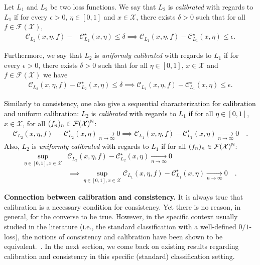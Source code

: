 \begin{definition}[Calibration]
Let $L_1$ and $L_2$ be two loss functions. We say that $L_2$ is \emph{calibrated} with regards to $L_1$ if for every $\epsilon>0$, $\eta\in[0,1]$ and $x\in\mathcal{X}$, there exists $ \delta>0$ such that for all $f\in\mathcal{F}(\mathcal{X})$,
\begin{align*}
    \mathcal{C}_{L_2}(x,\eta,f)- &\mathcal{C}^\star_{L_2}(x,\eta)\leq\delta\implies\mathcal{C}_{L_1}(x,\eta,f)- \mathcal{C}^\star_{L_1}(x,\eta)\leq \epsilon.
\end{align*}

Furthermore, we say that $L_2$ is \emph{uniformly calibrated} with regards to $L_1$ if for every $\epsilon>0$, there exists $ \delta>0$ such that for all $\eta\in[0,1]$, $x\in\mathcal{X}$ and $f\in\mathcal{F}(\mathcal{X})$ we have
\begin{align*}
    \mathcal{C}_{L_2}(x,\eta,f)- \mathcal{C}^\star_{L_2}(x,\eta)\leq\delta\implies\mathcal{C}_{L_1}(x,\eta,f)- \mathcal{C}^\star_{L_1}(x,\eta)\leq \epsilon.
\end{align*}
\end{definition}

\textcolor{black}{
Similarly to consistency, one also give a sequential characterization for calibration and uniform calibration: $L_2$ is \emph{calibrated} with regards to $L_1$ if for all $\eta\in[0,1]$, $x\in\mathcal{X}$, for all $(f_n)_n\in\mathcal{F}(\mathcal{X})^\mathbb{N}$:
\begin{align*}
   \mathcal{C}_{L_2}(x,\eta,f)&- \mathcal{C}^\star_{L_2}(x,\eta)\xrightarrow[n\to\infty]{} 0
   \implies \mathcal{C}_{L_1}(x,\eta,f)- \mathcal{C}^\star_{L_1}(x,\eta)\xrightarrow[n\to\infty]{} 0\quad.
\end{align*}
} 
\textcolor{black}{
Also, $L_2$ is \emph{uniformly calibrated} with regards to $L_1$ if for all $(f_n)_n\in\mathcal{F}(\mathcal{X})^\mathbb{N}$:
\begin{align*}
    \sup_{\eta\in[0,1],x\in\mathcal{X}} &\mathcal{C}_{L_2}(x,\eta,f)- \mathcal{C}^\star_{L_2}(x,\eta)\xrightarrow[n\to\infty]{} 0\\\
    &\implies\sup_{\eta\in[0,1],x\in\mathcal{X}} \mathcal{C}_{L_1}(x,\eta,f)- \mathcal{C}^\star_{L_1}(x,\eta)\xrightarrow[n\to\infty]{} 0\quad.
\end{align*} }


\textbf{Connection between calibration and consistency.}
It is always true that calibration is a necessary condition for consistency. Yet there is no reason, in general, for the converse to be true. However, in the specific context usually studied in the literature (i.e., the standard classification with a well-defined $0/1$-loss), the notions of consistency and calibration have been shown to be equivalent.~\citep{zhang2004statistical,bartlett2006convexity,steinwart2007compare}. In the next section, we come back on existing results regarding calibration and consistency in this specific (standard) classification setting. 


